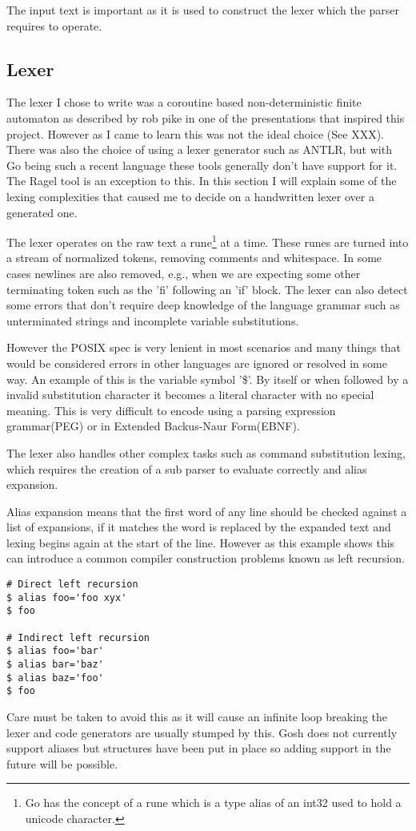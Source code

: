 The input text is important as it is used to construct the lexer which the parser requires to operate.

\subsection{Lexer}
The lexer I chose to write was a coroutine based non-deterministic finite automaton as described by rob pike in one of the presentations that inspired this project\cite{PIKE-LEXING-VIDEO}.
However as I came to learn this was not the ideal choice (See XXX).
There was also the choice of using a lexer generator such as ANTLR, but with Go being such a recent language these tools generally don't have support for it.
The Ragel tool is an exception to this.
In this section I will explain some of the lexing complexities that caused me to decide on a handwritten lexer over a generated one.

The lexer operates on the raw text a rune\footnote{Go has the concept of a rune which is a type alias of an int32 used to hold a unicode character.} at a time.
These runes are turned into a stream of normalized tokens, removing comments and whitespace.
In some cases newlines are also removed, e.g., when we are expecting some other terminating token such as the 'fi' following an 'if' block.
The lexer can also detect some errors that don't require deep knowledge of the language grammar such as unterminated strings and incomplete variable substitutions. 

However the POSIX spec is very lenient in most scenarios and many things that would be considered errors in other languages are ignored or resolved in some way.
An example of this is the variable symbol '\$'.
By itself or when followed by a invalid substitution character it becomes a literal character with no special meaning. This is very difficult to encode using a parsing expression grammar(PEG) or in Extended Backus-Naur Form(EBNF).

The lexer also handles other complex tasks such as command substitution lexing, which requires the creation of a sub parser to evaluate correctly and alias expansion.

Alias expansion means that the first word of any line should be checked against a list of expansions, if it matches the word is replaced by the expanded text and lexing begins again at the start of the line.
However as this example shows this can introduce a common compiler construction problems known as left recursion.
\begin{verbatim}
# Direct left recursion
$ alias foo='foo xyx'
$ foo

# Indirect left recursion
$ alias foo='bar'
$ alias bar='baz'
$ alias baz='foo'
$ foo
\end{verbatim}
Care must be taken to avoid this as it will cause an infinite loop breaking the lexer and code generators are usually stumped by this.
Gosh does not currently support aliases but structures have been put in place so adding support in the future will be possible.

